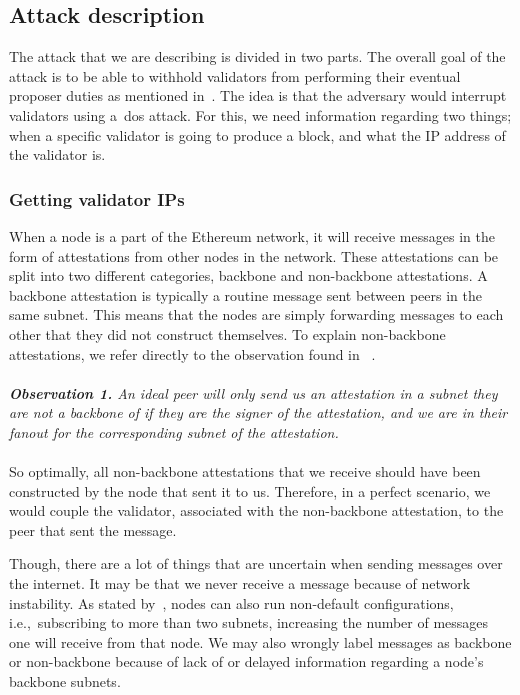 \subsection{Attack description}\label{subsec:attack-description}
The attack that we are describing is divided in two parts.
The overall goal of the attack is
to be able
to withhold validators from performing their eventual proposer duties
as mentioned in~\cite{EthereumAttackDefense2024}.
The idea is that the adversary would interrupt validators using a~\gls{dos} attack.
For this, we need information regarding two things;
when a specific validator is going to produce a block, and what the IP address of the validator is.

\subsubsection{Getting validator IPs}
When a node is a part of the Ethereum network,
it will receive messages in the form of attestations from other nodes in the network.
These attestations can be split into two different categories, backbone and non-backbone attestations.
A backbone attestation is typically a routine message sent between peers in the same subnet.
This means that the nodes are simply forwarding messages to each other that they did not construct themselves.
To explain non-backbone attestations,
we refer directly to the observation found in ~\cite{heimbach2024deanonymizingethereumvalidatorsp2p}.
\\\\
\textit{\textbf{Observation 1.} An ideal peer will only send us an attestation in a subnet they are not a backbone of
if they are the signer of the attestation,
    and we are in their fanout for the corresponding subnet of the attestation.}
\\\\

So optimally, all non-backbone attestations that we receive should have been constructed by the node that sent it to us.
Therefore, in a perfect scenario,
we would couple the validator, associated with the non-backbone attestation, to the peer that sent the message.

Though, there are a lot of things that are uncertain when sending messages over the internet.
It may be that we never receive a message because of network instability.
As stated by~\cite{heimbach2024deanonymizingethereumvalidatorsp2p}, nodes can also run non-default configurations,
i.e.,\ subscribing to more than two subnets, increasing the number of messages one will receive from that node.
We may also wrongly label messages as backbone or non-backbone because of lack of or delayed information regarding a node's backbone subnets.


